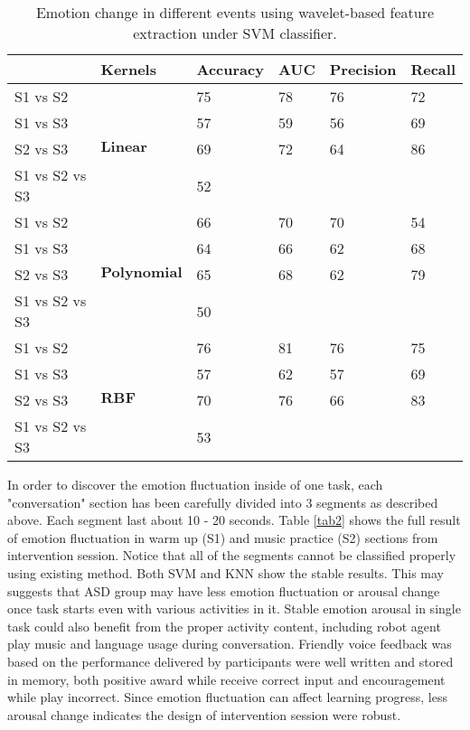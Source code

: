 \begin{table*}[tbp]
	\label{tab1}
	\begin{center}
		\begin{tabular}{llllll}
			& Kernels                     & Accuracy & AUC & Precision & Recall \\
			\hline
			S1 vs S2       & \multirow{4}{*}{\textbf{Linear}}     & 75       & 78  & 76        & 72     \\
			S1 vs S3       &                             & 57       & 59  & 56        & 69     \\
			S2 vs S3       &                             & 69       & 72  & 64        & 86     \\
			S1 vs S2 vs S3 &                             & \multicolumn{4}{l}{52}              \\
			\hline
			S1 vs S2       & \multirow{4}{*}{\textbf{Polynomial}} & 66       & 70  & 70        & 54     \\
			S1 vs S3       &                             & 64       & 66  & 62        & 68     \\
			S2 vs S3       &                             & 65       & 68  & 62        & 79     \\
			S1 vs S2 vs S3 &                             & \multicolumn{4}{l}{50}              \\
			\hline
			S1 vs S2       & \multirow{4}{*}{\textbf{RBF}}        & 76       & 81  & 76        & 75     \\
			S1 vs S3       &                             & 57       & 62  & 57        & 69     \\
			S2 vs S3       &                             & 70       & 76  & 66        & 83     \\
			S1 vs S2 vs S3 &                             & \multicolumn{4}{l}{53}              \\
			\hline
		\end{tabular}
		\caption{Emotion change in different events using wavelet-based feature extraction under SVM classifier. }\label{tab1}
	\end{center}
\end{table*}

In order to discover the emotion fluctuation inside of one task, each "conversation" section
has been carefully divided into 3 segments as described above. Each segment last about 10 - 20 seconds.
Table \ref{tab2} shows the full result of
emotion fluctuation in warm up (S1) and music practice (S2) sections from intervention session. Notice that
all of the segments cannot be classified properly using existing method. Both SVM and KNN show
the stable results. This may suggests that ASD group may have less emotion fluctuation or arousal
change once task starts even with various activities in it. Stable emotion arousal in single task
could also benefit from the proper activity content, including robot agent play music and language
usage during conversation. Friendly voice feedback was based on the performance delivered by participants
were well written and stored in memory, both positive award while receive correct input and encouragement
while play incorrect. Since emotion fluctuation can affect learning progress, less arousal change 
indicates the design of intervention session were robust. 


